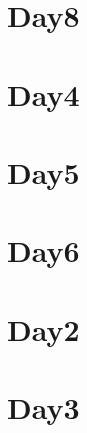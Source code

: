 
\section*{Day8}

\vfill
\section*{Day4}

\vfill
\section*{Day5}

\vfill
\section*{Day6}

\vfill
\section*{Day2}

\vfill
\section*{Day3}

\vfill
